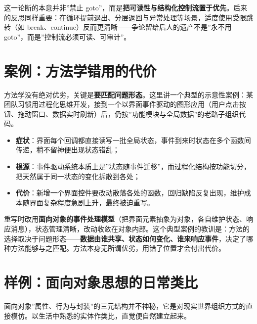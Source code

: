 \documentclass[12pt,a4paper,twoside,openany]{ctexbook}
\numberwithin{figure}{chapter}
\numberwithin{table}{chapter}
\providecommand{\tightlist}{\setlength{\itemsep}{0pt}\setlength{\parskip}{0pt}}
\begin{document}
这一论断的本意并非''禁止
goto''，而是\textbf{把可读性与结构化控制流置于优先}。后来的反思同样重要：在循环提前退出、分层返回与异常处理等场景，适度使用受限跳转（如
break、continue）反而更清晰------争论留给后人的遗产不是''永不用
goto''，而是''控制流必须可读、可审计''。

\section{案例：方法学错用的代价}\label{ux6848ux4f8bux65b9ux6cd5ux5b66ux9519ux7528ux7684ux4ee3ux4ef7}

方法学没有绝对优劣，关键是\textbf{要匹配问题形态}。这里讲一个典型的示意性案例：某团队习惯用过程化思维开发，接到一个以界面事件驱动的图形应用（用户点击按钮、拖动窗口、数据实时刷新）后，仍按''功能模块与全局数据''的老路子组织代码。

\begin{itemize}
\tightlist
\item
  \textbf{症状}：界面每个回调都直接读写一批全局状态，事件到来时状态在多个函数间传递，稍不留神便出现状态错乱；
\item
  \textbf{根源}：事件驱动系统本质上是''状态随事件迁移''，而过程化结构按功能切分，把天然属于同一状态的变化拆散到各处；
\item
  \textbf{代价}：新增一个界面控件要改动散落各处的函数，回归缺陷反复出现，维护成本随界面复杂程度急剧上升，最终被迫重写。
\end{itemize}

重写时改用\textbf{面向对象的事件处理模型}（把界面元素抽象为对象，各自维护状态、响应消息），状态管理清晰，改动收敛在对象内部。这个典型案例的教训是：方法的选择取决于问题形态------\textbf{数据由谁共享、状态如何变化、谁来响应事件}，决定了哪种方法能够与之匹配。方法本身无所谓优劣，用错了位置才会付出代价。

\section{样例：面向对象思想的日常类比}\label{ux6837ux4f8bux9762ux5411ux5bf9ux8c61ux601dux60f3ux7684ux65e5ux5e38ux7c7bux6bd4}

面向对象''属性、行为与封装''的三元结构并不神秘，它是对现实世界组织方式的直接模仿。以生活中熟悉的实体作类比，直觉便自然建立起来。
\end{document}
